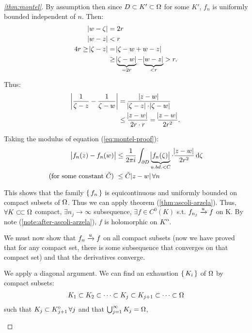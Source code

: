 \begin{proof}[\ref{thm:montel}]
By assumption then since $D\subset K' \subset \om$ for some $K'$, $f_n$ is uniformly bounded independent of $n$. Then:
\begin{align*}
    \abs{w-\zeta} &= 2r\\
    \abs{w-z} &< r\\
    4r \geq \abs{\zeta - z} &= \abs{\zeta - w + w -z}\\
    &\geq  \underbrace{\abs{\zeta - w}}_{=2r} - \underbrace{\abs{w-z}}_{<r} > r.
\end{align*}

Thus:
\begin{align*}
    \abs{\frac{1}{\zeta - z} - \frac{1}{\zeta - w}} &= \frac{\abs{z-w}}{\abs{\zeta-z} \cdot \abs{\zeta-w}}\\
    &\leq \frac{\abs{z-w}}{2r\cdot r} = \frac{\abs{z-w}}{2r^2}.
\end{align*}

Taking the modulus of equation (\ref{eq:montel-proof}):
\begin{align*}
    \abs{f_n(z) - f_n(w)} &\leq \frac{1}{2 \pi i} \int_{\partial D} \underbrace{\abs{f_n(\zeta) }}_{u.bd. <C} \cdot \frac{\abs{z-w}}{2r^2} \dif \zeta\\
    \text{(for some constant $\Tilde{C}$) }& \leq \Tilde{C} \abs{z-w} \forall n
\end{align*}

This shows that the family $\set{ f_n } $ is equicontinuous and uniformly bounded on compact subsets of $\om$. Thus we can apply theorem (\ref{thm:ascoli-arzela}). Thus, $\forall K \ssubset \om$ compact, $\exists n_j \to \infty$ subsequence, $\exists f \in C^0 (K) $ s.t. $f_{n_j} \tou f$ on K. By note (\ref{note:after-ascoli-arzela}), $f$ is holomorphic on $\interior{K}$.

We must now show that $f_n \tou f$ on all compact subsets (now we have proved that for any compact set, there is some subsequence that converges on that compact set) and that the derivatives converge.

We apply a diagonal argument. We can find an exhaustion $\set{ K_i }$ of $\om$ by compact subsets:
\begin{align*}
    K_1 \subset K_2 \subset \cdots \subset K_j \subset K_{j+1} \subset \cdots \subset \om
\end{align*}
such that $K_j \subset \interior{K}_{j+1} \, \forall j$ and that $\bigcup_{j=1}^\infty K_j = \om$,



\begin{center}
    \begin{tikzpicture}
    

\end{tikzpicture}
\end{center}
\end{proof}
